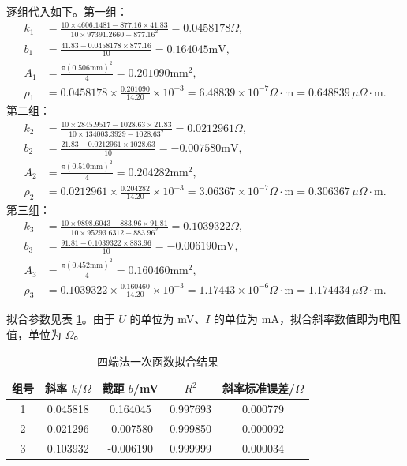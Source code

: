 \documentclass[UTF8,a4paper,12pt]{ctexart}
\begin{document}
逐组代入如下。第一组：
{\small
\begin{align*}
 k_1&=\frac{10\times4606.1481-877.16\times41.83}{10\times97391.2660-877.16^2}=0.0458178\Omega,\\
 b_1&=\frac{41.83-0.0458178\times877.16}{10}=0.164045\mathrm{mV},\\
 A_1&=\frac{\pi(0.506\mathrm{mm})^2}{4}=0.201090\mathrm{mm^2},\\
 \rho_1&=0.0458178\times\frac{0.201090}{14.20}\times10^{-3}
       =6.48839\times10^{-7}\Omega\cdot\mathrm{m}=0.648839\,\mu\Omega\cdot\mathrm{m}.
\end{align*}}
第二组：
{\small
\begin{align*}
 k_2&=\frac{10\times2845.9517-1028.63\times21.83}{10\times134003.3929-1028.63^2}=0.0212961\Omega,\\
 b_2&=\frac{21.83-0.0212961\times1028.63}{10}=-0.007580\mathrm{mV},\\
 A_2&=\frac{\pi(0.510\mathrm{mm})^2}{4}=0.204282\mathrm{mm^2},\\
 \rho_2&=0.0212961\times\frac{0.204282}{14.20}\times10^{-3}
       =3.06367\times10^{-7}\Omega\cdot\mathrm{m}=0.306367\,\mu\Omega\cdot\mathrm{m}.
\end{align*}}
第三组：
{\small
\begin{align*}
 k_3&=\frac{10\times9898.6043-883.96\times91.81}{10\times95293.6312-883.96^2}=0.1039322\Omega,\\
 b_3&=\frac{91.81-0.1039322\times883.96}{10}=-0.006190\mathrm{mV},\\
 A_3&=\frac{\pi(0.452\mathrm{mm})^2}{4}=0.160460\mathrm{mm^2},\\
 \rho_3&=0.1039322\times\frac{0.160460}{14.20}\times10^{-3}
       =1.17443\times10^{-6}\Omega\cdot\mathrm{m}=1.174434\,\mu\Omega\cdot\mathrm{m}.
\end{align*}}

拟合参数见表 \ref{tab:fit_result}。由于 $U$ 的单位为 mV、$I$ 的单位为 mA，拟合斜率数值即为电阻值，单位为 $\Omega$。

\begin{table}[H]
\centering
\caption{四端法一次函数拟合结果}
\label{tab:fit_result}
\begin{tabular}{ccccc}
\toprule
组号 & 斜率 $k/\Omega$ & 截距 $b$/mV & $R^2$ & 斜率标准误差/$\Omega$ \\
\midrule
1 & 0.045818 & 0.164045 & 0.997693 & 0.000779 \\
2 & 0.021296 & -0.007580 & 0.999850 & 0.000092 \\
3 & 0.103932 & -0.006190 & 0.999999 & 0.000034 \\
\bottomrule
\end{tabular}
\end{table}
\end{document}
